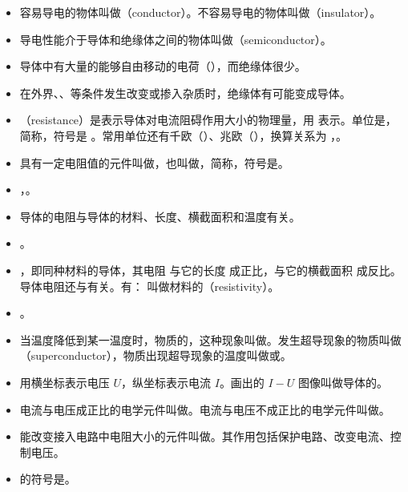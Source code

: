 \begin{itemize}
\item 容易导电的物体叫做（conductor）。不容易导电的物体叫做（insulator）。
\item 导电性能介于导体和绝缘体之间的物体叫做（semiconductor）。
\item 导体中有大量的能够自由移动的电荷（），而绝缘体很少。
\item 在外界、、等条件发生改变或掺入杂质时，绝缘体有可能变成导体。
\item {}（resistance）是表示导体对电流阻碍作用大小的物理量，用  表示。单位是，简称，符号是 \blue{$\bm\Omega$}。常用单位还有千欧（）、兆欧（），换算关系为 ，。
\item 具有一定电阻值的元件叫做，也叫做，简称，符号是\resistance。
\item {}，。
\item 导体的电阻与导体的材料、长度、横截面积和温度有关。
\item {}。
\item {}，即同种材料的导体，其电阻  与它的长度  成正比，与它的横截面积  成反比。导体电阻还与有关。有：
\blue{$\bm\rho$} 叫做材料的（resistivity）。
\item {}。
\item 当温度降低到某一温度时，物质的，这种现象叫做。发生超导现象的物质叫做（superconductor），物质出现超导现象的温度叫做或。
\item 用横坐标表示电压 $U$，纵坐标表示电流 $I$。画出的 $I-U$ 图像叫做导体的。
\item 电流与电压成正比的电学元件叫做。电流与电压不成正比的电学元件叫做。
\item 能改变接入电路中电阻大小的元件叫做。其作用包括保护电路、改变电流、控制电压。
\item {}的符号是\slidingrheostat。
\end{itemize}